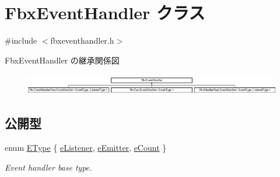 \hypertarget{class_fbx_event_handler}{}\section{Fbx\+Event\+Handler クラス}
\label{class_fbx_event_handler}


{\ttfamily \#include $<$fbxeventhandler.\+h$>$}

Fbx\+Event\+Handler の継承関係図\begin{figure}[H]
\begin{center}
\leavevmode
\includegraphics[height=0.954817cm]{class_fbx_event_handler}
\end{center}
\end{figure}
\subsection*{公開型}
\begin{DoxyCompactItemize}
\item 
enum \hyperlink{class_fbx_event_handler_a47139da2cfd5abee91664d75c4fb577c}{E\+Type} \{ \hyperlink{class_fbx_event_handler_a47139da2cfd5abee91664d75c4fb577ca288df77e1147943ca82bc3a7d8bc493b}{e\+Listener}, 
\hyperlink{class_fbx_event_handler_a47139da2cfd5abee91664d75c4fb577cae2c0d7da494cef8d787ee3495e24a6c0}{e\+Emitter}, 
\hyperlink{class_fbx_event_handler_a47139da2cfd5abee91664d75c4fb577ca2c6941dcdf691c32251fae0beabeadb2}{e\+Count}
 \}\begin{DoxyCompactList}\small\item\em Event handler base type. \end{DoxyCompactList}
\end{DoxyCompactItemize}
